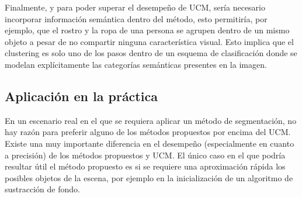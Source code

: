 \documentclass[10pt,twocolumn,letterpaper]{article}
\begin{document}
Finalmente, y para poder superar el desempeño de UCM, sería necesario incorporar información semántica dentro del método, esto permitiría, por ejemplo, que  el rostro y la ropa de una persona se agrupen dentro de un mismo objeto a pesar de no compartir ninguna característica visual. Esto implica que el clustering es solo uno de los pasos dentro de un esquema de clasificación donde se modelan explícitamente las categorías semánticas presentes en la imagen.


\subsection{Aplicación en la práctica}
En un escenario real en el que se requiera aplicar un método de segmentación, no hay razón para preferir alguno de los métodos propuestos por encima del UCM. Existe una muy importante diferencia en el desempeño (especialmente en cuanto a precisión) de los métodos propuestos y UCM. El único caso en el que podría resultar útil el método propuesto es si se requiere una aproximación rápida los posibles objetos de la escena, por ejemplo en la inicialización de un algoritmo de sustracción de fondo.


{\small


}
\end{document}

